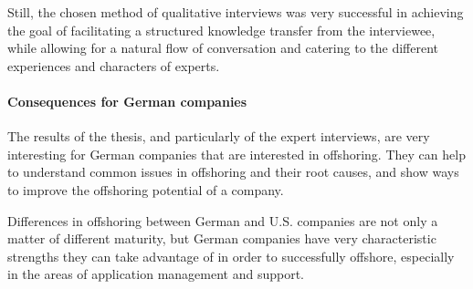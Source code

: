 Still, the chosen method of qualitative interviews was very successful in achieving the goal of facilitating a structured knowledge transfer from the interviewee, while allowing for a natural flow of conversation and catering to the different experiences and characters of experts.

\paragraph{Consequences for German companies}
The results of the thesis, and particularly of the expert interviews, are very interesting for German companies that are interested in offshoring. They can help to understand common issues in offshoring and their root causes, and show ways to improve the offshoring potential of a company. 

Differences in offshoring between German and U.S. companies are not only a matter of different maturity, but German companies have very characteristic strengths they can take advantage of in order to successfully offshore, especially in the areas of application management and support. 






